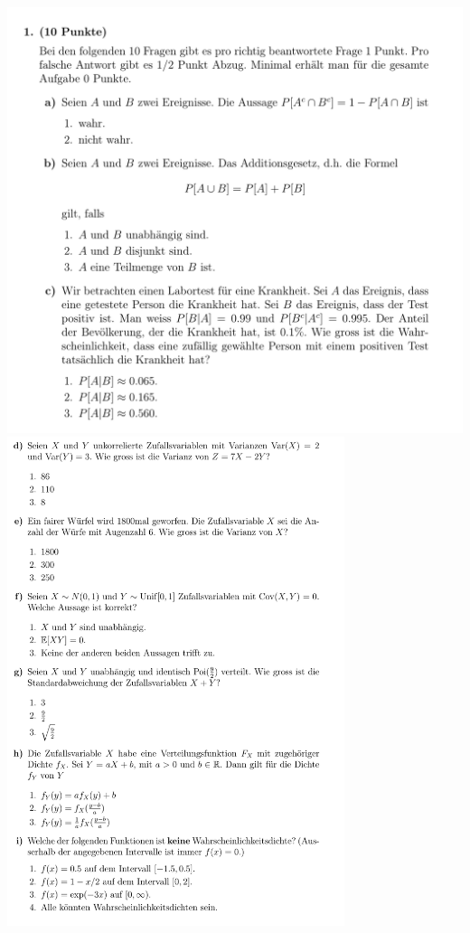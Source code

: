 \includegraphics[width=0.8\linewidth]{old_exams_prtsrc/sch_infk_so19_ml-01.png}\newline
\includegraphics[height=143mm]{old_exams_prtsrc/sch_infk_so19_ml-02.png}\newline
